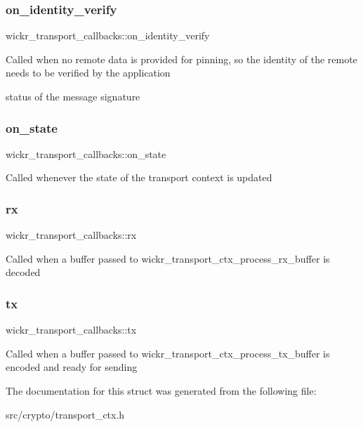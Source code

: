 \subsubsection{\texorpdfstring{on\+\_\+identity\+\_\+verify}{on\_identity\_verify}}
{\footnotesize\ttfamily wickr\+\_\+transport\+\_\+callbacks\+::on\+\_\+identity\+\_\+verify}

Called when no remote data is provided for pinning, so the identity of the remote needs to be verified by the application

status of the message signature \mbox{\label{structwickr__transport__callbacks_afef0716506b88885c57fda652500b3da}} 
\subsubsection{\texorpdfstring{on\+\_\+state}{on\_state}}
{\footnotesize\ttfamily wickr\+\_\+transport\+\_\+callbacks\+::on\+\_\+state}

Called whenever the state of the transport context is updated \mbox{\label{structwickr__transport__callbacks_a5d523402980ac09fdf52aa4824f8e9f7}} 
\subsubsection{\texorpdfstring{rx}{rx}}
{\footnotesize\ttfamily wickr\+\_\+transport\+\_\+callbacks\+::rx}

Called when a buffer passed to wickr\+\_\+transport\+\_\+ctx\+\_\+process\+\_\+rx\+\_\+buffer is decoded \mbox{\label{structwickr__transport__callbacks_a06c4b21b847c00e92373cf1402e1cb9d}} 
\subsubsection{\texorpdfstring{tx}{tx}}
{\footnotesize\ttfamily wickr\+\_\+transport\+\_\+callbacks\+::tx}

Called when a buffer passed to wickr\+\_\+transport\+\_\+ctx\+\_\+process\+\_\+tx\+\_\+buffer is encoded and ready for sending 

The documentation for this struct was generated from the following file\+:\begin{DoxyCompactItemize}
\item 
src/crypto/transport\+\_\+ctx.\+h\end{DoxyCompactItemize}

